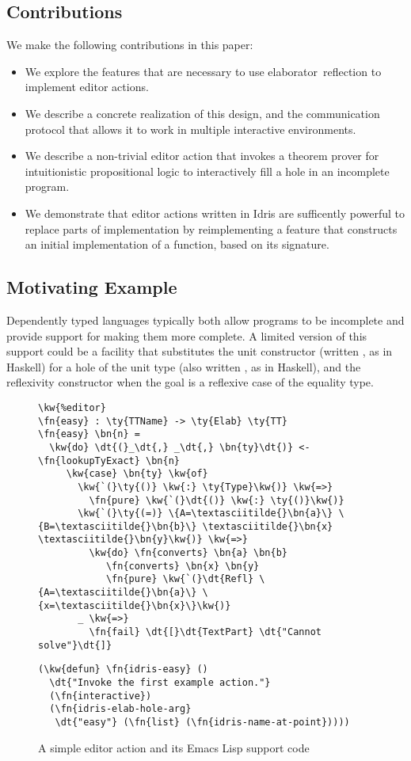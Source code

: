 \subsection*{Contributions}

We make the following contributions in this paper:
\begin{itemize}
\item We explore the features that are necessary to use
  \mbox{elaborator reflection} to implement editor actions.
\item We describe a concrete realization of this design, and the
  communication protocol that allows it to work in multiple
  interactive environments.
\item We describe a non-trivial editor action that invokes a
  theorem prover for intuitionistic propositional logic to
  interactively fill a hole in an incomplete
  program.
\item We demonstrate that editor actions written in Idris are
  sufficently powerful to replace parts of implementation by
  reimplementing a feature that constructs an initial implementation
  of a function, based on its signature.
\end{itemize}


\subsection{Motivating Example}

Dependently typed languages typically both allow programs to be
incomplete and provide support for making them more complete. A
limited version of this support could be a facility that substitutes
the unit constructor (written \dt{()}, as in Haskell) for a hole of
the unit type (also written \ty{()}, as in Haskell), and the
reflexivity constructor  when the goal is a reflexive case of
the equality type.

\begin{figure}[b]
\begin{Verbatim}
\kw{%editor}
\fn{easy} : \ty{TTName} -> \ty{Elab} \ty{TT}
\fn{easy} \bn{n} =
  \kw{do} \dt{(}_\dt{,} _\dt{,} \bn{ty}\dt{)} <- \fn{lookupTyExact} \bn{n}
     \kw{case} \bn{ty} \kw{of}
       \kw{`(}\ty{()} \kw{:} \ty{Type}\kw{)} \kw{=>}
         \fn{pure} \kw{`(}\dt{()} \kw{:} \ty{()}\kw{)}
       \kw{`(}\ty{(=)} \{A=\textasciitilde{}\bn{a}\} \{B=\textasciitilde{}\bn{b}\} \textasciitilde{}\bn{x} \textasciitilde{}\bn{y}\kw{)} \kw{=>}
         \kw{do} \fn{converts} \bn{a} \bn{b}
            \fn{converts} \bn{x} \bn{y}
            \fn{pure} \kw{`(}\dt{Refl} \{A=\textasciitilde{}\bn{a}\} \{x=\textasciitilde{}\bn{x}\}\kw{)}
       _ \kw{=>}
         \fn{fail} \dt{[}\dt{TextPart} \dt{"Cannot solve"}\dt{]}
\end{Verbatim}
\hrulefill
\begin{Verbatim}
(\kw{defun} \fn{idris-easy} ()
  \dt{"Invoke the first example action."}
  (\fn{interactive})
  (\fn{idris-elab-hole-arg}
   \dt{"easy"} (\fn{list} (\fn{idris-name-at-point}))))
\end{Verbatim}
  \caption{A simple editor action and its Emacs Lisp support code}
  \label{fig:motivating-example}
\end{figure}

